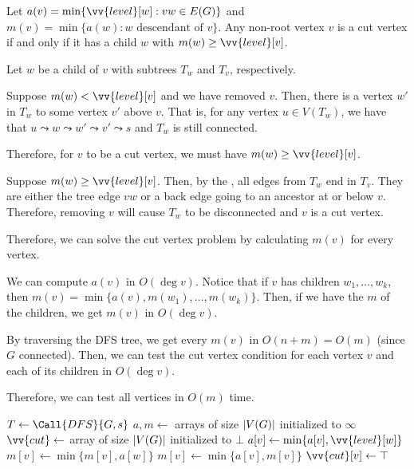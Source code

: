 \begin{prop}
  Let $a(v) = \min\{\vv{level}[w] : vw \in E(G)\}$
  and $m(v) = \min\{a(w) : \text{$w$ descendant of $v$}\}$.
  Any non-root vertex $v$ is a cut vertex if and only if
  it has a child $w$ with $m(w) \geq \vv{level}[v]$.
\end{prop}
\begin{prf}
  Let $w$ be a child of $v$ with subtrees $T_w$ and $T_v$, respectively.

  Suppose $m(w) < \vv{level}[v]$ and we have removed $v$.
  Then, there is a vertex $w'$ in $T_w$ to some vertex $v'$ above $v$.
  That is, for any vertex $u \in V(T_w)$, we have that
  $u \leadsto w \leadsto w' \leadsto v' \leadsto s$
  and $T_w$ is still connected.

  Therefore, for $v$ to be a cut vertex, we must have $m(w) \geq \vv{level}[v]$.

  Suppose $m(w) \geq \vv{level}[v]$.
  Then, by the ,
  all edges from $T_w$ end in $T_v$.
  They are either the tree edge $vw$
  or a back edge going to an ancestor at or below $v$.
  Therefore, removing $v$ will cause $T_w$ to be disconnected and $v$ is a cut vertex.
\end{prf}

Therefore, we can solve the cut vertex problem by calculating $m(v)$ for every vertex.

We can compute $a(v)$ in $O(\deg v)$.
Notice that if $v$ has children $w_1,\dotsc,w_k$,
then $m(v) = \min\{a(v), m(w_1), \dotsc, m(w_k)\}$.
Then, if we have the $m$ of the children, we get $m(v)$ in $O(\deg v)$.

By traversing the DFS tree, we get every $m(v)$ in $O(n+m) = O(m)$ (since $G$ connected).
Then, we can test the cut vertex condition for each vertex $v$
and each of its children in $O(\deg v)$.

Therefore, we can test all vertices in $O(m)$ time.

\begin{algorithm}[H]
  \caption{}
  \begin{algorithmic}[1]
    \State $T \gets \Call{DFS}{G, s}$
    \State $a, m \gets$ arrays of size $\abs{V(G)}$ initialized to $\infty$
    \State $\vv{cut} \gets$ array of size $\abs{V(G)}$ initialized to $\bot$
    \State $a[v] \gets \min\{a[v], \vv{level}[w]\}$
    \State {}
    \State $m[v] \gets \min\{m[v], a[w]\}$
    \EndFor
    \State $m[v] \gets \min\{a[v], m[v]\}$
     $\vv{cut}[v] \gets \top$ \EndIf
    \EndFor
    \EndProcedure
    \State {}
  \end{algorithmic}
\end{algorithm}

